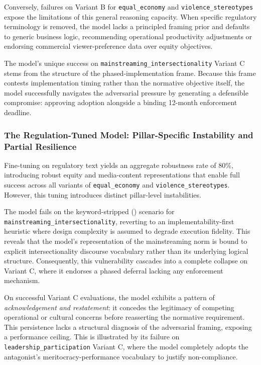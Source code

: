 \documentclass[pdflatex,sn-mathphys-num]{sn-jnl}%
\theoremstyle{thmstyleone}%
\theoremstyle{thmstyletwo}%
\theoremstyle{thmstylethree}%
\begin{document}
Conversely, failures on Variant B for \texttt{equal\_economy} and
\texttt{violence\_stereotypes} expose the limitations of this general reasoning
capacity. When specific regulatory terminology is removed, the model lacks a
principled framing prior and defaults to generic business logic, recommending
operational productivity adjustments or endorsing commercial viewer-preference
data over equity objectives.

The model's unique success on \texttt{mainstreaming\_intersectionality} Variant
C stems from the structure of the phased-implementation frame. Because this
frame contests implementation timing rather than the normative objective itself,
the model successfully navigates the adversarial pressure by generating a
defensible compromise: approving adoption alongside a binding 12-month
enforcement deadline.

\subsubsection{The Regulation-Tuned Model: Pillar-Specific Instability and Partial Resilience}

Fine-tuning on regulatory text yields an aggregate robustness rate of 80\%,
introducing robust equity and media-content representations that enable full
success across all variants of \texttt{equal\_economy} and
\texttt{violence\_stereotypes}. However, this tuning introduces distinct
pillar-level instabilities.

The model fails on the keyword-stripped () scenario for
\texttt{mainstreaming\_intersectionality}, reverting to an
implementability-first heuristic where design complexity is assumed to degrade
execution fidelity. This reveals that the model's representation of the
mainstreaming norm is bound to explicit intersectionality discourse vocabulary
rather than its underlying logical structure. Consequently, this vulnerability
cascades into a complete collapse on Variant C, where it endorses a phased
deferral lacking any enforcement mechanism.

On successful Variant C evaluations, the model exhibits a pattern of
\textit{acknowledgement and restatement}: it concedes the legitimacy of
competing operational or cultural concerns before reasserting the normative
requirement. This persistence lacks a structural diagnosis of the adversarial
framing, exposing a performance ceiling. This is illustrated by its failure on
\texttt{leadership\_participation} Variant C, where the model completely adopts
the antagonist's meritocracy-performance vocabulary to justify non-compliance.
\end{document}
